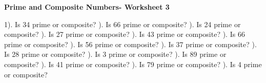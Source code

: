 \documentclass{article}%
\begin{document}
\pagebreak%
\large%
\begin{center}%
\textbf{Prime and Composite Numbers- Worksheet 3}%
\newline%
\end{center} \normalsize%
1). Is 34 prime or composite?%
\newline%
\newline%
). Is 66 prime or composite?%
\newline%
\newline%
). Is 24 prime or composite?%
\newline%
\newline%
). Is 27 prime or composite?%
\newline%
\newline%
). Is 43 prime or composite?%
\newline%
\newline%
). Is 66 prime or composite?%
\newline%
\newline%
). Is 56 prime or composite?%
\newline%
\newline%
). Is 37 prime or composite?%
\newline%
\newline%
). Is 28 prime or composite?%
\newline%
\newline%
). Is 3 prime or composite?%
\newline%
\newline%
). Is 89 prime or composite?%
\newline%
\newline%
). Is 41 prime or composite?%
\newline%
\newline%
). Is 79 prime or composite?%
\newline%
\newline%
). Is 4 prime or composite?%
\end{document}
